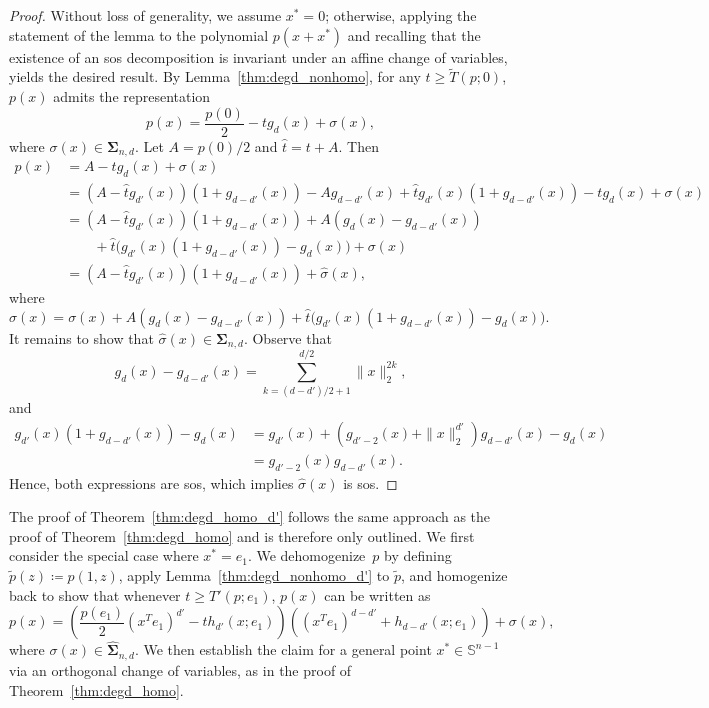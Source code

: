 \documentclass[12pt]{article}
\newcommand{\SOS}{\mathbf{\Sigma}}
\newcommand{\HSOS}{\widehat{\mathbf{\Sigma}}}
\newcommand{\defeq}{\coloneq}
\newcommand{\mbS}{\mathbb{S}}
\theoremstyle{remark}
\begin{document}
\begin{proof}
Without loss of generality, we assume $x^*=0$; otherwise, applying the statement of the lemma to the polynomial $p(x+x^*)$ and recalling that the existence of an sos decomposition is invariant under an affine change of variables, yields the desired result. By Lemma~\ref{thm:degd_nonhomo}, for any $t\ge \tilde{T}(p;0)$, $p(x)$ admits the representation
\[p(x)=\frac{p(0)}{2}-tg_d(x)+\sigma(x),\]
where $\sigma(x)\in\SOS_{n,d}$. Let $A=p(0)/2$ and $\hat{t}=t+A$. Then 
\[\begin{aligned}
p(x)&=A-tg_d(x)+\sigma(x)\\
&=\left(A-\hat{t}g_{d'}(x)\right)(1+g_{d-d'}(x))-Ag_{d-d'}(x)+\hat{t}g_{d'}(x)(1+g_{d-d'}(x))-tg_d(x)+\sigma(x)\\
&=\left(A-\hat{t}g_{d'}(x)\right)(1+g_{d-d'}(x)) + A\left(g_{d}(x)-g_{d-d'}(x)\right)\\
&\qquad +\hat{t}\big(g_{d'}(x)(1+g_{d-d'}(x))-g_d(x)\big)+ \sigma(x)\\
&=\left(A-\hat{t}g_{d'}(x)\right)(1+g_{d-d'}(x))+\hat{\sigma}(x),
\end{aligned}\]
where \[\hat{\sigma}(x)=\sigma(x)+A\left(g_{d}(x)-g_{d-d'}(x)\right)+\hat{t}\big(g_{d'}(x)(1+g_{d-d'}(x))-g_d(x)\big).\]
It remains to show that $\hat{\sigma}(x)\in\SOS_{n,d}$.
Observe that
\[g_{d}(x)-g_{d-d'}(x)=\sum_{k=(d-d')/2+1}^{d/2}\|x\|_2^{2k},\]
and
\[\begin{aligned}
   g_{d'}(x)(1+g_{d-d'}(x))-g_d(x)&=g_{d'}(x)+\left(g_{d'-2}(x)+\|x\|_2^{d'}\right)g_{d-d'}(x)-g_d(x)\\
   &=g_{d'-2}(x)g_{d-d'}(x).
\end{aligned}\]
Hence, both expressions are sos, which implies $\hat{\sigma}(x)$ is sos.
\end{proof}



The proof of Theorem~\ref{thm:degd_homo_d'} follows the same approach as the proof of Theorem~\ref{thm:degd_homo} and is therefore only outlined. We first consider the special case where $x^* = e_1$. We dehomogenize~$p$ by defining $\tilde{p}(z)\defeq p(1,z)$, apply Lemma~\ref{thm:degd_nonhomo_d'} to $\tilde{p}$, and homogenize back to show that whenever  $t \geq T'(p; e_1)$, $p(x)$ can be written as 
\[
    p(x)=\left(\frac{p(e_1)}{2}(x^Te_1)^{d'}-th_{d'}(x;e_1)\right)\left((x^Te_1)^{d-d'}+h_{d-d'}(x;e_1)\right)+\sigma(x),
\]
where $\sigma(x) \in \HSOS_{n,d}$. We then establish the claim for a general point $x^* \in \mbS^{n-1}$ via an orthogonal change of variables, as in the proof of Theorem~\ref{thm:degd_homo}.
\end{document}
